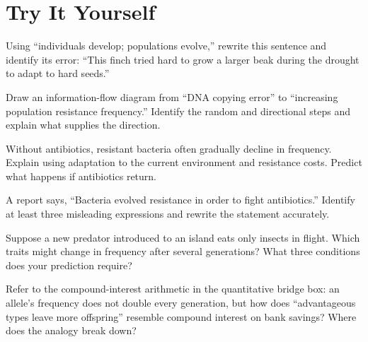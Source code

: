 \section*{Try It Yourself}

\begin{sikaoti}
\item Using ``individuals develop; populations evolve,'' rewrite this sentence and identify its error: ``This finch tried hard to grow a larger beak during the drought to adapt to hard seeds.''
\item Draw an information-flow diagram from ``DNA copying error'' to ``increasing population resistance frequency.'' Identify the random and directional steps and explain what supplies the direction.
\item Without antibiotics, resistant bacteria often gradually decline in frequency. Explain using adaptation to the current environment and resistance costs. Predict what happens if antibiotics return.
\item A report says, ``Bacteria evolved resistance in order to fight antibiotics.'' Identify at least three misleading expressions and rewrite the statement accurately.
\item Suppose a new predator introduced to an island eats only insects in flight. Which traits might change in frequency after several generations? What three conditions does your prediction require?
\item Refer to the compound-interest arithmetic in the quantitative bridge box: an allele's frequency does not double every generation, but how does ``advantageous types leave more offspring'' resemble compound interest on bank savings? Where does the analogy break down?
\end{sikaoti}
